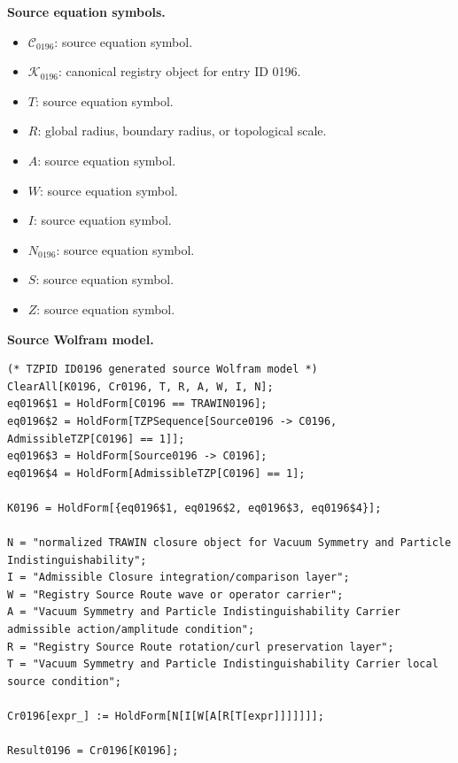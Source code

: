 \begin{minipage}[t]{0.49\linewidth}
\begingroup
\small
\raggedright
\textbf{Source equation symbols.}\par
\begin{itemize}[leftmargin=1.35em,itemsep=1pt,topsep=1pt,parsep=0pt]
    \item $\mathcal{C}_{0196}$: source equation symbol.
    \item $\mathcal{K}_{0196}$: canonical registry object for entry ID 0196.
    \item $T$: source equation symbol.
    \item $R$: global radius, boundary radius, or topological scale.
    \item $A$: source equation symbol.
    \item $W$: source equation symbol.
    \item $I$: source equation symbol.
    \item $N_{0196}$: source equation symbol.
    \item $S$: source equation symbol.
    \item $Z$: source equation symbol.
\end{itemize}
\endgroup
\end{minipage}\hfill
\begin{minipage}[t]{0.47\linewidth}
\begingroup
\scriptsize
\raggedright
\textbf{Source Wolfram model.}\par
\begin{Verbatim}[fontsize=\tiny,breaklines=true,breakanywhere=true]
(* TZPID ID0196 generated source Wolfram model *)
ClearAll[K0196, Cr0196, T, R, A, W, I, N];
eq0196$1 = HoldForm[C0196 == TRAWIN0196];
eq0196$2 = HoldForm[TZPSequence[Source0196 -> C0196, AdmissibleTZP[C0196] == 1]];
eq0196$3 = HoldForm[Source0196 -> C0196];
eq0196$4 = HoldForm[AdmissibleTZP[C0196] == 1];

K0196 = HoldForm[{eq0196$1, eq0196$2, eq0196$3, eq0196$4}];

N = "normalized TRAWIN closure object for Vacuum Symmetry and Particle Indistinguishability";
I = "Admissible Closure integration/comparison layer";
W = "Registry Source Route wave or operator carrier";
A = "Vacuum Symmetry and Particle Indistinguishability Carrier admissible action/amplitude condition";
R = "Registry Source Route rotation/curl preservation layer";
T = "Vacuum Symmetry and Particle Indistinguishability Carrier local source condition";

Cr0196[expr_] := HoldForm[N[I[W[A[R[T[expr]]]]]]];

Result0196 = Cr0196[K0196];
\end{Verbatim}
\endgroup
\end{minipage}

